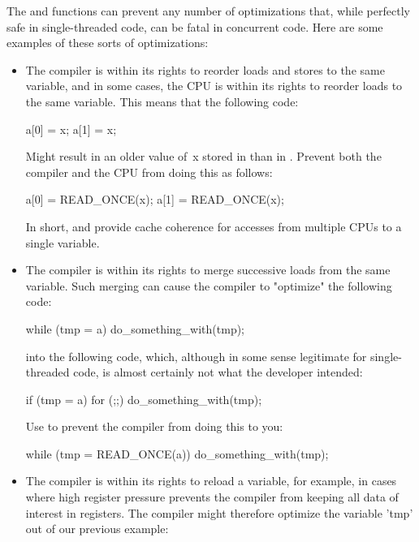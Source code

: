 The  and  functions can prevent any number of
optimizations that, while perfectly safe in single-threaded code, can
be fatal in concurrent code.
Here are some examples of these sorts of optimizations:

\begin{itemize}
 \item
     The compiler is within its rights to reorder loads and stores
     to the same variable, and in some cases, the CPU is within its
     rights to reorder loads to the same variable.
     This means that the following code:

\begin{VerbatimU}
	a[0] = x;
	a[1] = x;
\end{VerbatimU}

     Might result in an older value of~x stored in  than in .
     Prevent both the compiler and the CPU from doing this as follows:

\begin{VerbatimU}
	a[0] = READ_ONCE(x);
	a[1] = READ_ONCE(x);
\end{VerbatimU}

     In short,  and  provide cache coherence
     for accesses from multiple CPUs to a single variable.

 \item
     The compiler is within its rights to merge successive loads from
     the same variable.
     Such merging can cause the compiler to "optimize" the following code:

\begin{VerbatimU}
	while (tmp = a)
		do_something_with(tmp);
\end{VerbatimU}

     into the following code, which, although in some sense legitimate
     for single-threaded code, is almost certainly not what the developer
     intended:

\begin{VerbatimU}
	if (tmp = a)
		for (;;)
			do_something_with(tmp);
\end{VerbatimU}

     Use  to prevent the compiler from doing this to you:

\begin{VerbatimU}
	while (tmp = READ_ONCE(a))
		do_something_with(tmp);
\end{VerbatimU}

 \item
     The compiler is within its rights to reload a variable, for example,
     in cases where high register pressure prevents the compiler from
     keeping all data of interest in registers.
     The compiler might therefore optimize the variable 'tmp' out of
     our previous example:


\end{itemize}
